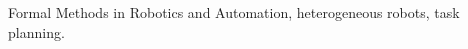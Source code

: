\documentclass[lettersize,journal]{IEEEtran}
\theoremstyle{italiclemma}
\theoremstyle{italiclemma}
\theoremstyle{definition}
\begin{document}
\begin{abstract}
\end{abstract}

\begin{IEEEkeywords}
Formal Methods in Robotics and Automation, heterogeneous robots, task planning.
\end{IEEEkeywords}
\end{document}
